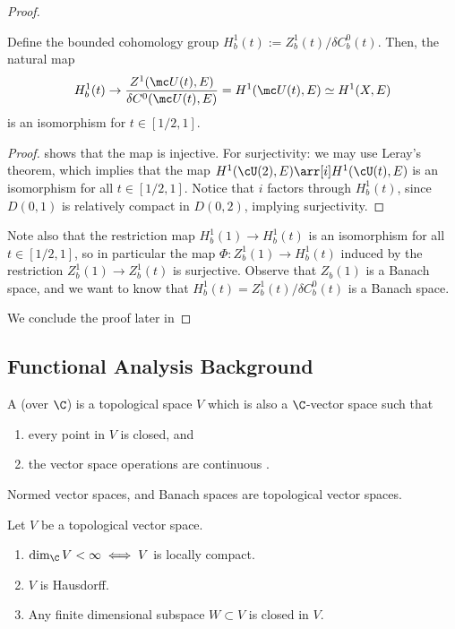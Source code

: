\documentclass[11pt]{report}
\begin{document}
\begin{proof}
    \begin{claim}
        Define the bounded cohomology group $H_b^1(t):=Z^1_b(t)/ \delta C_b^0(t)$. Then, the natural map
        \[
        H^1_b(t) \to \frac{Z^1(\mc U(t),E)}{\delta C^0(\mc U(t),E)}=H^1(\mc U(t),E)\simeq H^1(X,E)
        \]
        is an isomorphism for $t\in [1/2,1]$.
    \end{claim}
    \begin{proof}
         shows that the map is injective. For surjectivity: we may use Leray's theorem, which implies that the map $H^1(\cU(2),E)\arr[i]H^1(\cU(t),E)$ is an isomorphism for all $t \in [1/2,1]$. Notice that $i$ factors through $H^1_b(t)$, since $D(0,1)$ is relatively compact in $D(0,2)$, implying surjectivity.
    \end{proof}
     Note also that the restriction map $H_b^1(1) \to H_b^1(t)$ is an isomorphism for all $t\in[1/2,1]$, so in particular the map $\Phi:Z^1_b(1) \to H_b^1(t)$ induced by the restriction $Z^1_b(1) \to Z^1_b(t)$ is surjective. Observe that $Z_b(1)$ is a Banach space, and we want to know that $H_b^1(t)=Z_b^1(t)/\delta C_b^0(t)$ is a Banach space.

     We conclude the proof later in 
\end{proof}

\subsection{Functional Analysis Background}

\begin{defn}
A  (over $\C$) is a topological space $V$ which is also a $\C$-vector space such that
\begin{enumerate}
    \item[(i)] every point in $V$ is closed, and
    \item[(ii)] the vector space operations are continuous .
\end{enumerate}
\end{defn}

\begin{ex}
    Normed vector spaces, and Banach spaces are topological vector spaces.
\end{ex}

\begin{notebox}[Facts]
    Let $V$ be a topological vector space.
    \begin{enumerate}
        \item $\dim_\C V<\infty \iff V$ is locally compact.
        \item $V$ is Hausdorff.
        \item Any finite dimensional subspace $W \subset V$ is closed in $V$.
    \end{enumerate}
\end{notebox}
\end{document}
